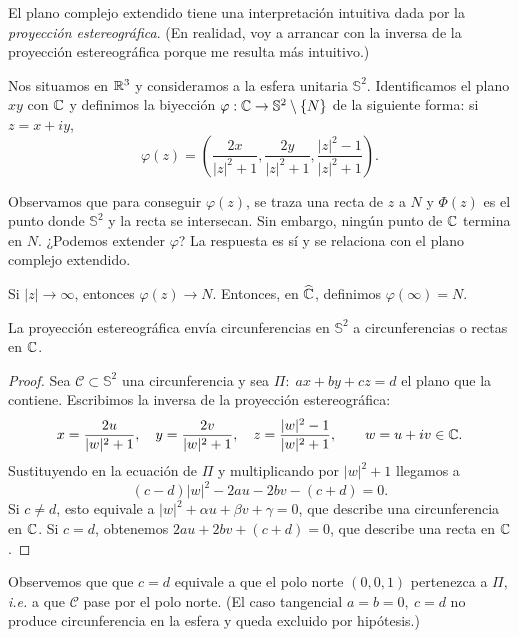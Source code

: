 El plano complejo extendido tiene una interpretación intuitiva dada por la \textit{proyección estereográfica}. (En realidad, voy a arrancar con la inversa de la proyección estereográfica porque me resulta más intuitivo.) 

Nos situamos en $\mathbb{R}^3$ y consideramos a la esfera unitaria $\mathbb{S}^2$. Identificamos el plano $xy$ con $\mathbb{C}$ y definimos la biyección $\varphi : \mathbb{C} \to \mathbb{S}^2 \setminus \{N\}$ de la siguiente forma: si $z = x + iy$,
\begin{equation*}
    \varphi(z) = \left(\frac{2x}{|z|^2 + 1}, \frac{2y}{|z|^2 + 1}, \frac{|z|^2 - 1}{|z|^2 + 1}\right).
\end{equation*}



Observamos que para conseguir $\varphi(z)$, se traza una recta de $z$ a $N$ y $\Phi(z)$ es el punto donde $\mathbb{S}^2$ y la recta se intersecan.  Sin embargo, ningún punto de $\mathbb{C}$ termina en $N$. ¿Podemos extender $\varphi$? La respuesta es sí y se relaciona con el plano complejo extendido.

Si $|z| \to \infty$, entonces $\varphi(z) \to N$. Entonces, en $\widehat{\mathbb{C}}$, definimos $\varphi(\infty) = N$.

\begin{proposition}
    La proyección estereográfica envía circunferencias en $\mathbb{S}^2$ a circunferencias o rectas en $\mathbb{C}$.
\end{proposition}

\begin{proof}
    Sea $\mathcal C\subset\mathbb S^2$ una circunferencia y sea $\Pi:\; ax+by+cz=d$ el plano que la contiene.
    Escribimos la inversa de la proyección estereográfica:
    \begin{equation*}
    x=\frac{2u}{|w|^2+1},\quad
    y=\frac{2v}{|w|^2+1},\quad
    z=\frac{|w|^2-1}{|w|^2+1},\qquad w=u+iv\in\mathbb{C}.
    \end{equation*}
    Sustituyendo en la ecuación de $\Pi$ y multiplicando por $|w|^2+1$ llegamos a
    \begin{equation*}
    (c-d)|w|^2-2au-2bv-(c+d)=0.
    \end{equation*}
    Si $c\neq d$, esto equivale a $|w|^2+\alpha u+\beta v+\gamma=0$, que describe una circunferencia en $\mathbb{C}$.
    Si $c=d$, obtenemos $2au+2bv+(c+d)=0$, que describe una recta en $\mathbb{C}$.
\end{proof}

\begin{remark}
    Observemos que que $c=d$ equivale a que el polo norte $(0,0,1)$ pertenezca a $\Pi$, \textit{i.e.} a que $\mathcal C$ pase por el polo norte. (El caso tangencial $a=b=0,\ c=d$ no produce circunferencia en la esfera y queda excluido por hipótesis.)
\end{remark}

